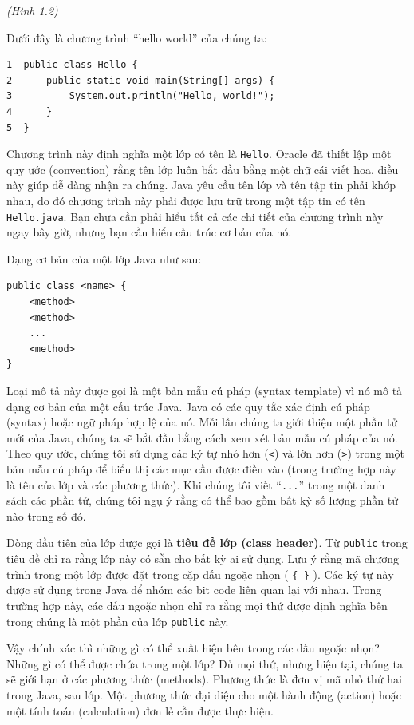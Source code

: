 \emph{(Hình 1.2)}

Dưới đây là chương trình ``hello world'' của chúng ta:

\begin{verbatim}
1  public class Hello {
2      public static void main(String[] args) {
3          System.out.println("Hello, world!");
4      }
5  }
\end{verbatim}

Chương trình này định nghĩa một lớp có tên là \texttt{Hello}. Oracle đã
thiết lập một quy ước (convention) rằng tên lớp luôn bắt đầu bằng một
chữ cái viết hoa, điều này giúp dễ dàng nhận ra chúng. Java yêu cầu tên
lớp và tên tập tin phải khớp nhau, do đó chương trình này phải được lưu
trữ trong một tập tin có tên \texttt{Hello.java}. Bạn chưa cần phải hiểu
tất cả các chi tiết của chương trình này ngay bây giờ, nhưng bạn cần
hiểu cấu trúc cơ bản của nó.

Dạng cơ bản của một lớp Java như sau:

\begin{verbatim}
public class <name> {
    <method>
    <method>
    ...
    <method>
}
\end{verbatim}

Loại mô tả này được gọi là một bản mẫu cú pháp (syntax template) vì nó
mô tả dạng cơ bản của một cấu trúc Java. Java có các quy tắc xác định cú
pháp (syntax) hoặc ngữ pháp hợp lệ của nó. Mỗi lần chúng ta giới thiệu
một phần tử mới của Java, chúng ta sẽ bắt đầu bằng cách xem xét bản mẫu
cú pháp của nó. Theo quy ước, chúng tôi sử dụng các ký tự nhỏ hơn
(\texttt{\textless{}}) và lớn hơn (\texttt{\textgreater{}}) trong một
bản mẫu cú pháp để biểu thị các mục cần được điền vào (trong trường hợp
này là tên của lớp và các phương thức). Khi chúng tôi viết
``\texttt{...}'' trong một danh sách các phần tử, chúng tôi ngụ ý rằng
có thể bao gồm bất kỳ số lượng phần tử nào trong số đó.

Dòng đầu tiên của lớp được gọi là \textbf{tiêu đề lớp (class header)}.
Từ \texttt{public} trong tiêu đề chỉ ra rằng lớp này có sẵn cho bất kỳ
ai sử dụng. Lưu ý rằng mã chương trình trong một lớp được đặt trong cặp
dấu ngoặc nhọn ( \texttt{\{\ \}} ). Các ký tự này được sử dụng trong
Java để nhóm các bit code liên quan lại với nhau. Trong trường hợp này,
các dấu ngoặc nhọn chỉ ra rằng mọi thứ được định nghĩa bên trong chúng
là một phần của lớp \texttt{public} này.

Vậy chính xác thì những gì có thể xuất hiện bên trong các dấu ngoặc
nhọn? Những gì có thể được chứa trong một lớp? Đủ mọi thứ, nhưng hiện
tại, chúng ta sẽ giới hạn ở các phương thức (methods). Phương thức là
đơn vị mã nhỏ thứ hai trong Java, sau lớp. Một phương thức đại diện cho
một hành động (action) hoặc một tính toán (calculation) đơn lẻ cần được
thực hiện.


